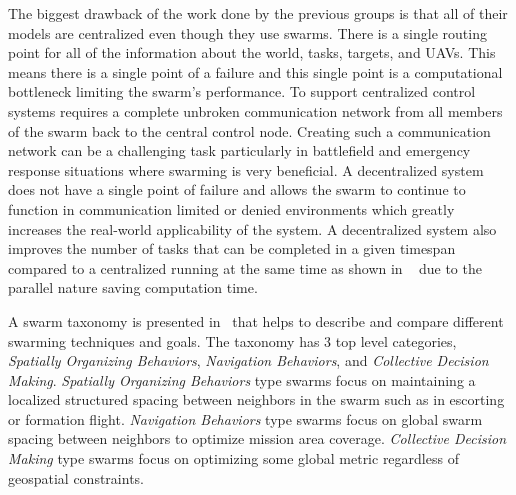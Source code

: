 The biggest drawback of the work done by the previous groups is that all of their models are centralized even though they use swarms.  There is a single routing point for all of the information about the world, tasks, targets, and UAVs.  This means there is a single point of a failure and this single point is a computational bottleneck limiting the swarm's performance.  To support centralized control systems requires a complete unbroken communication network from all members of the swarm back to the central control node.  Creating such a communication network can be a challenging task particularly in battlefield and emergency response situations where swarming is very beneficial.  A decentralized system does not have a single point of failure and allows the swarm to continue to function in communication limited or denied environments which greatly increases the real-world applicability of the system.  A decentralized system also improves the number of tasks that can be completed in a given timespan compared to a centralized running at the same time as shown in ~\cite{chien} due to the parallel nature saving computation time.  

A swarm taxonomy is presented in~\cite{iridia} that helps to describe and compare different swarming techniques and goals. The taxonomy has 3 top level categories, \textit{Spatially Organizing Behaviors}, \textit{Navigation Behaviors}, and \textit{Collective Decision Making}.  \textit{Spatially Organizing Behaviors} type swarms focus on maintaining a localized structured spacing between neighbors in the swarm such as in escorting or formation flight.  \textit{Navigation Behaviors} type swarms focus on global swarm spacing between neighbors to optimize mission area coverage.  \textit{Collective Decision Making} type swarms focus on optimizing some global metric regardless of geospatial constraints.

